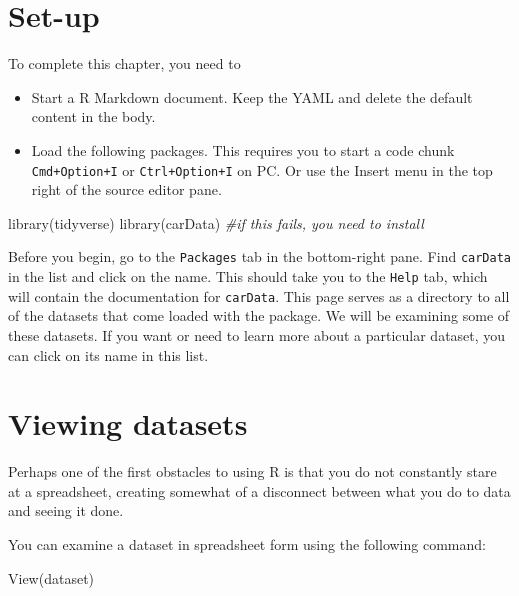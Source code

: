 \documentclass[
]{book}
\makeatletter
\newenvironment{Shaded}{\begin{snugshade}}{\end{snugshade}}
\newcommand{\CommentTok}[1]{\textcolor[rgb]{0.37,0.37,0.37}{\textit{#1}}}
\newcommand{\FunctionTok}[1]{\textcolor[rgb]{0,0,0}{#1}}
\newcommand{\NormalTok}[1]{#1}
\providecommand{\tightlist}{%
  \setlength{\itemsep}{0pt}\setlength{\parskip}{0pt}}
\newenvironment{kframe}{%
\medskip{}
\setlength{\fboxsep}{.8em}
 \def\at@end@of@kframe{}%
 \ifinner\ifhmode%
  \def\at@end@of@kframe{\end{minipage}}%
  \begin{minipage}{\columnwidth}%
 \fi\fi%
 \def\FrameCommand##1{\hskip\@totalleftmargin \hskip-\fboxsep
 \colorbox{shadecolor}{##1}\hskip-\fboxsep
     \hskip-\linewidth \hskip-\@totalleftmargin \hskip\columnwidth}%
 \MakeFramed {\advance\hsize-\width
   \@totalleftmargin\z@ \linewidth\hsize
   \@setminipage}}%
 {\par\unskip\endMakeFramed%
 \at@end@of@kframe}
\renewenvironment{Shaded}{\begin{kframe}}{\end{kframe}}
\makeatother
\begin{document}
\hypertarget{set-up}{%
\section{Set-up}\label{set-up}}

To complete this chapter, you need to

\begin{itemize}
\tightlist
\item
  Start a R Markdown document. Keep the YAML and delete the default content in the body.
\item
  Load the following packages. This requires you to start a code chunk \texttt{Cmd+Option+I} or \texttt{Ctrl+Option+I} on PC. Or use the Insert menu in the top right of the source editor pane.
\end{itemize}

\begin{Shaded}
\begin{Highlighting}[]
\FunctionTok{library}\NormalTok{(tidyverse)}
\FunctionTok{library}\NormalTok{(carData)  }\CommentTok{\#if this fails, you need to install}
\end{Highlighting}
\end{Shaded}

Before you begin, go to the \texttt{Packages} tab in the bottom-right pane. Find \texttt{carData} in the list and click on the name. This should take you to the \texttt{Help} tab, which will contain the documentation for \texttt{carData}. This page serves as a directory to all of the datasets that come loaded with the package. We will be examining some of these datasets. If you want or need to learn more about a particular dataset, you can click on its name in this list.

\hypertarget{viewing-datasets}{%
\section{Viewing datasets}\label{viewing-datasets}}

Perhaps one of the first obstacles to using R is that you do not constantly stare at a spreadsheet, creating somewhat of a disconnect between what you do to data and seeing it done.

You can examine a dataset in spreadsheet form using the following command:

\begin{Shaded}
\begin{Highlighting}[]
\FunctionTok{View}\NormalTok{(dataset)}
\end{Highlighting}
\end{Shaded}
\end{document}
